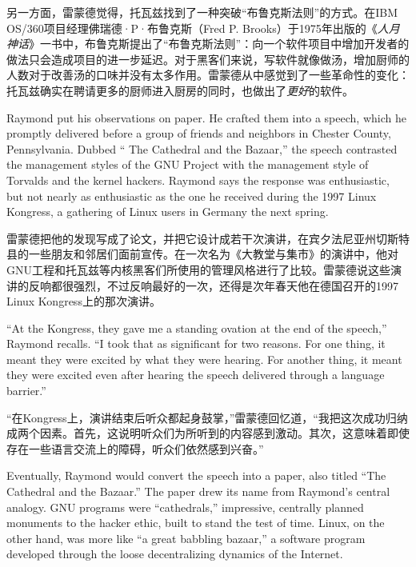 \ifdefined\chs
另一方面，雷蒙德觉得，托瓦兹找到了一种突破``布鲁克斯法则''的方式。在IBM OS/360项目经理佛瑞德·P·布鲁克斯（Fred P. Brooks）于1975年出版的《\textit{人月神话}》一书中，布鲁克斯提出了``布鲁克斯法则''：向一个软件项目中增加开发者的做法只会造成项目的进一步延迟。对于黑客们来说，写软件就像做汤，增加厨师的人数对于改善汤的口味并没有太多作用。雷蒙德从中感觉到了一些革命性的变化：托瓦兹确实在聘请更多的厨师进入厨房的同时，也做出了\textit{更好}的软件。
\fi

\ifdefined\eng
Raymond put his observations on paper. He crafted them into a speech, which he promptly delivered before a group of friends and neighbors in Chester County, Pennsylvania. Dubbed `` The Cathedral and the Bazaar,'' the speech contrasted the management styles of the GNU Project with the management style of Torvalds and the kernel hackers. Raymond says the response was enthusiastic, but not nearly as enthusiastic as the one he received during the 1997 Linux Kongress, a gathering of Linux users in Germany the next spring.
\fi

\ifdefined\chs
雷蒙德把他的发现写成了论文，并把它设计成若干次演讲，在宾夕法尼亚州切斯特县的一些朋友和邻居们面前宣传。在一次名为《大教堂与集市》的演讲中，他对GNU工程和托瓦兹等内核黑客们所使用的管理风格进行了比较。雷蒙德说这些演讲的反响都很强烈，不过反响最好的一次，还得是次年春天他在德国召开的1997 Linux Kongress上的那次演讲。
\fi

\ifdefined\eng
``At the Kongress, they gave me a standing ovation at the end of the speech,'' Raymond recalls. ``I took that as significant for two reasons. For one thing, it meant they were excited by what they were hearing. For another thing, it meant they were excited even after hearing the speech delivered through a language barrier.''
\fi

\ifdefined\chs
``在Kongress上，演讲结束后听众都起身鼓掌，''雷蒙德回忆道，``我把这次成功归纳成两个因素。首先，这说明听众们为所听到的内容感到激动。其次，这意味着即使存在一些语言交流上的障碍，听众们依然感到兴奋。''
\fi

\ifdefined\eng
Eventually, Raymond would convert the speech into a paper, also titled ``The Cathedral and the Bazaar.'' The paper drew its name from Raymond's central analogy. GNU programs were ``cathedrals,'' impressive, centrally planned monuments to the hacker ethic, built to stand the test of time. Linux, on the other hand, was more like ``a great babbling bazaar,'' a software program developed through the loose decentralizing dynamics of the Internet.
\fi

